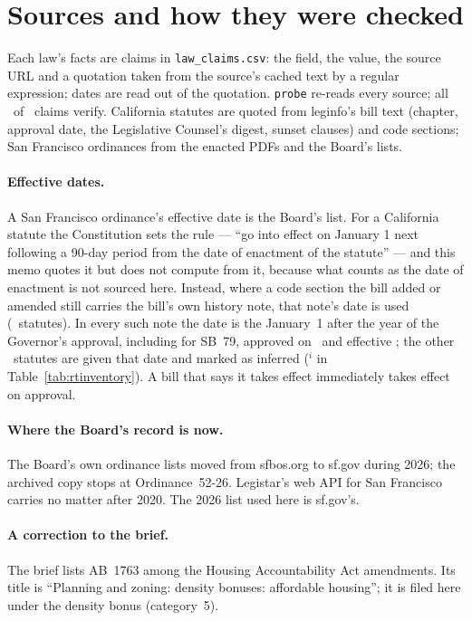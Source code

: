 \documentclass[11pt]{article}
\begin{document}
\section{Sources and how they were checked}\label{sec:rtsources}

Each law's facts are claims in \texttt{law\_claims.csv}: the field, the value, the source URL
and a quotation taken from the source's cached text by a regular expression; dates are read out
of the quotation. \texttt{probe} re-reads every source; all \rtClaimsOk\ of \rtClaims\ claims
verify. California statutes are quoted from leginfo's bill text (chapter, approval date, the
Legislative Counsel's digest, sunset clauses) and code sections; San Francisco ordinances from
the enacted PDFs and the Board's lists.

\paragraph{Effective dates.} A San Francisco ordinance's effective date is the Board's list.
For a California statute the Constitution sets the rule --- ``go into effect on January 1 next
following a 90-day period from the date of enactment of the statute'' --- and this memo quotes it
but does not compute from it, because what counts as the date of enactment is not sourced here.
Instead, where a code section the bill added or amended still carries the bill's own history
note, that note's date is used (\rtEffNotes\ statutes). In every such note the date is the
January~1 after the year of the Governor's approval, including for SB~79, approved on
\rtEnactedSbSevenNine\ and effective \rtEffSbSevenNine; the other \rtEffInferred\ statutes are given that date and marked as inferred
($^i$ in Table~\ref{tab:rtinventory}). A bill that says it takes effect immediately takes effect
on approval.

\paragraph{Where the Board's record is now.} The Board's own ordinance lists moved from
sfbos.org to sf.gov during 2026; the archived copy stops at Ordinance~52-26. Legistar's web API
for San Francisco carries no matter after 2020. The 2026 list used here is sf.gov's.

\paragraph{A correction to the brief.} The brief lists AB~1763 among the Housing Accountability
Act amendments. Its title is ``Planning and zoning: density bonuses: affordable housing''; it is
filed here under the density bonus (category~5).
\end{document}
